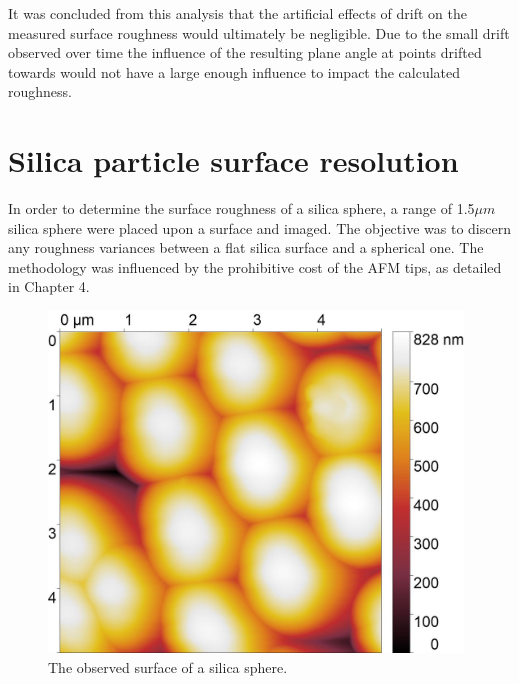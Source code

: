 It was concluded from this analysis that the artificial effects of drift on the measured surface roughness would ultimately be negligible. Due to the small drift observed over time the influence of the resulting plane angle at points drifted towards would not have a large enough influence to impact the calculated roughness.









\section{Silica particle surface resolution} %

In order to determine the surface roughness of a silica sphere, a range of 1.5$\mu m$ silica sphere were placed upon a surface and imaged. The objective was to discern any roughness variances between a flat silica surface and a spherical one. The methodology was influenced by the prohibitive cost of the AFM tips, as detailed in Chapter 4.



\begin{figure}[h]     %
        \begin{center}
          \includegraphics[width=110mm]{chapter3/5umareat2.jpg}
\end{center}
\caption{The observed surface of a silica sphere.}
\label{fig:SiliSph1}                 %
\end{figure}

